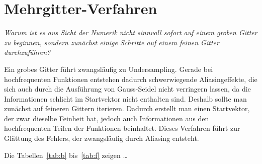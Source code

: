 \documentclass[paper = a4]{scrartcl}
\begin{document}

\section{Mehrgitter-Verfahren}

\emph{Warum ist es aus Sicht der Numerik nicht sinnvoll sofort auf einem groben Gitter zu beginnen, sondern zunächst einige Schritte auf einem feinen Gitter durchzuführen?}

Ein grobes Gitter führt zwangsläufig zu Undersampling. Gerade bei hochfrequenten Funktionen entstehen dadurch schwerwiegende Aliasingeffekte, die sich auch durch die Ausführung von Gauss-Seidel nicht verringern lassen, da die Informationen schlicht im Startvektor nicht enthalten sind. Deshalb sollte man zunächst auf feineren Gittern iterieren. Dadurch erstellt man einen Startvektor, der zwar dieselbe Feinheit hat, jedoch auch Informationen aus den hochfrequenten Teilen der Funktionen beinhaltet. Dieses Verfahren führt zur Glättung des Fehlers, der zwangsläufig durch Aliasing entsteht.

Die Tabellen~\ref{tab:b} bis~\ref{tab:f} zeigen \dots
\end{document}
